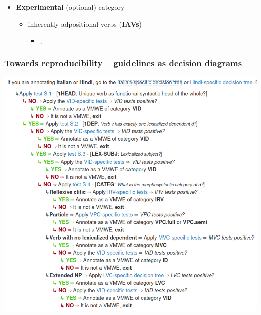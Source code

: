 \documentclass[xcolor=dvipsnames]{beamer}
\begin{document}
\begin{frame}
\begin{scriptsize}
\begin{block}{}
\begin{itemize}
\item \textbf{Experimental} (optional) category
   \begin{itemize}
   \item inherently adpositional verbs (\textbf{IAVs})
	\begin{itemize}
	\item[]  , 
	\end{itemize}	
   \end{itemize}
\end{itemize}
\end{block}
\end{scriptsize}

\end{frame}


\begin{frame} 
\frametitle{Towards reproducibility -- guidelines as decision diagrams}

\centering
\includegraphics[scale=0.3]{Images/decision-diagram}


\end{frame}
\end{document}
